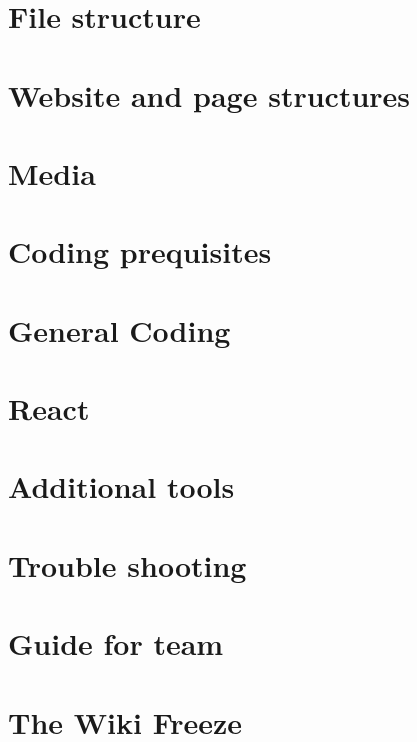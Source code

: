 \documentclass[a4paper, 11pt, twoside]{book}
\begin{document}
\chapter{File structure} \label{sec:structure}
%
\newpage
%
\chapter{Website and page structures} \label{sec:webstructure}
%
\newpage
%
\chapter{Media}\label{sec:media}
%
\newpage
%
\chapter{Coding prequisites} \label{sec:cod}
%
\newpage
%
\chapter{General Coding}  \label{sec:coding}
%
\newpage
%
\chapter{React} \label{sec:react}
%
%
\newpage
%
\chapter{Additional tools} \label{sec:addtools}
%
\newpage
%
\chapter{Trouble shooting} \label{sec:troubleshooting}
%
\newpage
%
\chapter{Guide for team} \label{sec:guide}
%
\newpage
%
\chapter{The Wiki Freeze}  \label{sec:freeze}
%
\newpage
%
\end{document}
